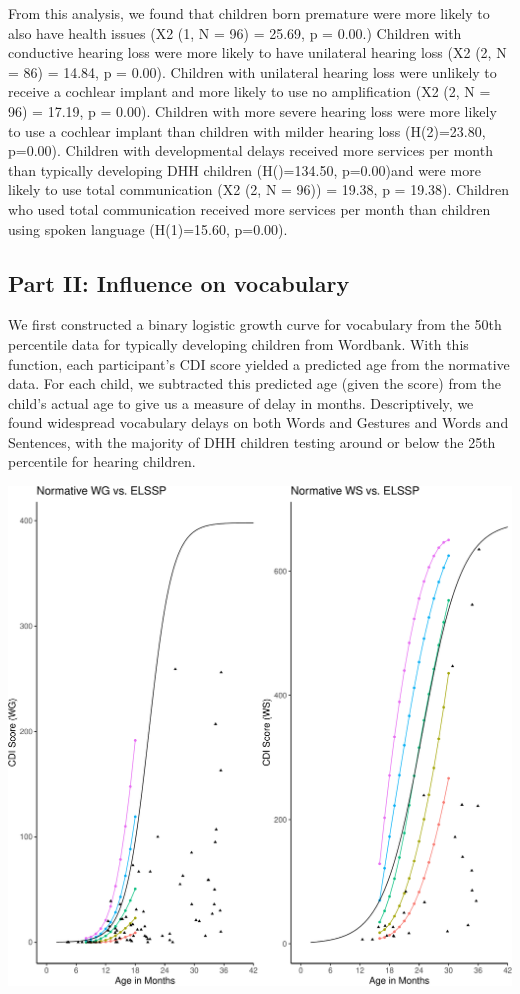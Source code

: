 \documentclass[english,man]{apa6}
\begin{document}
From this analysis, we found that children born premature were more likely to also have health issues (X2 (1, N = 96) = 25.69, p = 0.00.) Children with conductive hearing loss were more likely to have unilateral hearing loss (X2 (2, N = 86) = 14.84, p = 0.00). Children with unilateral hearing loss were unlikely to receive a cochlear implant and more likely to use no amplification (X2 (2, N = 96) = 17.19, p = 0.00). Children with more severe hearing loss were more likely to use a cochlear implant than children with milder hearing loss (H(2)=23.80, p=0.00). Children with developmental delays received more services per month than typically developing DHH children (H()=134.50, p=0.00)and were more likely to use total communication (X2 (2, N = 96)) = 19.38, p = 19.38). Children who used total communication received more services per month than children using spoken language (H(1)=15.60, p=0.00).

\hypertarget{part-ii-influence-on-vocabulary}{%
\subsection{Part II: Influence on vocabulary}\label{part-ii-influence-on-vocabulary}}

We first constructed a binary logistic growth curve for vocabulary from the 50th percentile data for typically developing children from Wordbank. With this function, each participant's CDI score yielded a predicted age from the normative data. For each child, we subtracted this predicted age (given the score) from the child's actual age to give us a measure of delay in months. Descriptively, we found widespread vocabulary delays on both Words and Gestures and Words and Sentences, with the majority of DHH children testing around or below the 25th percentile for hearing children.

\includegraphics{ELSSP_paper_files/figure-latex/wg-ws-rainbow-plot-1.pdf}
\end{document}
